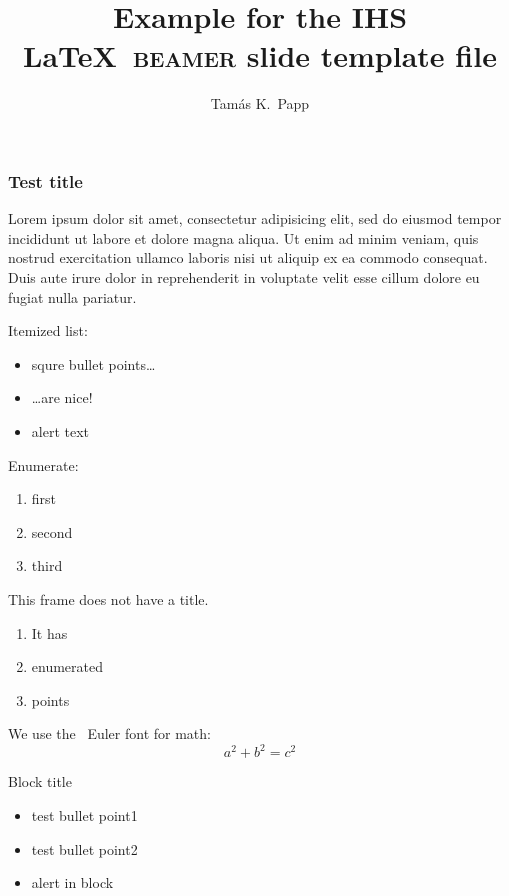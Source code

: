 \documentclass{beamer}
\begin{document}
\title[Short title]{Example for the IHS \LaTeX\ \textsc{beamer} slide template file}
\author[Tam\'as]{Tam\'as K.~Papp}

\begin{frame}[plain]
  \titlepage
\end{frame}

\begin{frame}
  \frametitle{Test title}

  Lorem ipsum dolor sit amet, consectetur adipisicing elit, sed do eiusmod tempor incididunt ut labore et dolore magna aliqua. Ut enim ad minim veniam, quis nostrud exercitation ullamco laboris nisi ut aliquip ex ea commodo consequat. Duis aute irure dolor in reprehenderit in voluptate velit esse cillum dolore eu fugiat nulla pariatur.

Itemized list:
\begin{itemize}
\item squre bullet points\dots
\item \dots are nice!
\item \alert{alert text}
\end{itemize}

Enumerate:
\begin{enumerate}
\item first
\item second
\item third
\end{enumerate}

\end{frame}

\begin{frame}
  This frame does not have a title.
  \begin{enumerate}
  \item It has
  \item enumerated
  \item points
  \end{enumerate}
  We use the \AmS\ Euler font for math:
  \begin{equation*}
    a^2+b^2=c^2
  \end{equation*}

  \begin{block}{Block title}
    \begin{itemize}
    \item test bullet point1
    \item test bullet point2
    \item \alert{alert in block}
    \end{itemize}
  \end{block}

\end{frame}
\end{document}
